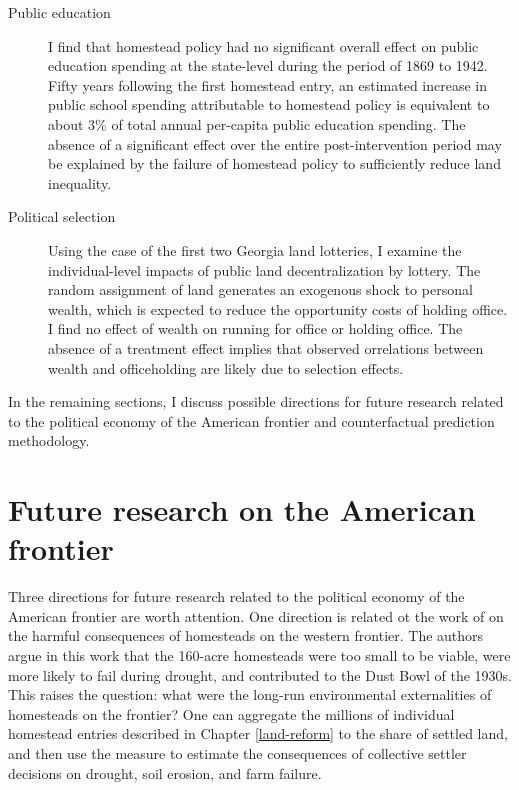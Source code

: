 \begin{description}
	\item[Public education] I find that homestead policy had no significant overall effect on public education spending at the state-level during the period of 1869 to 1942. Fifty years following the first homestead entry, an estimated increase in public school spending attributable to homestead policy is equivalent to about 3\% of total annual per-capita public education spending. The absence of a significant effect over the entire post-intervention period may be explained by the failure of homestead policy to sufficiently reduce land inequality. 
	
	\item[Political selection] Using the case of the first two Georgia land lotteries, I examine the individual-level impacts of public land decentralization by lottery. The random assignment of land generates an exogenous shock to personal wealth, which is expected to reduce the opportunity costs of holding office. I find no effect of wealth on running for office or holding office. The absence of a treatment effect implies that observed  orrelations between wealth and officeholding are likely due to selection effects.
	
\end{description}

In the remaining sections, I discuss possible directions for future research related to the political economy of the American frontier and counterfactual prediction methodology. 

\section{Future research on the American frontier}

Three directions for future research related to the political economy of the American frontier are worth attention. One direction is related ot the work of \citet{hansen2001us} on the harmful consequences of homesteads on the western frontier. The authors argue in this work that the 160-acre homesteads were too small to be viable, were more likely to fail during drought, and contributed to the Dust Bowl of the 1930s. This raises the question: what were the long-run environmental externalities of homesteads on the frontier? One can aggregate the millions of individual homestead entries described in Chapter \ref{land-reform} to the share of settled land, and then use the measure to estimate the consequences of collective settler decisions on drought, soil erosion, and farm failure. 

